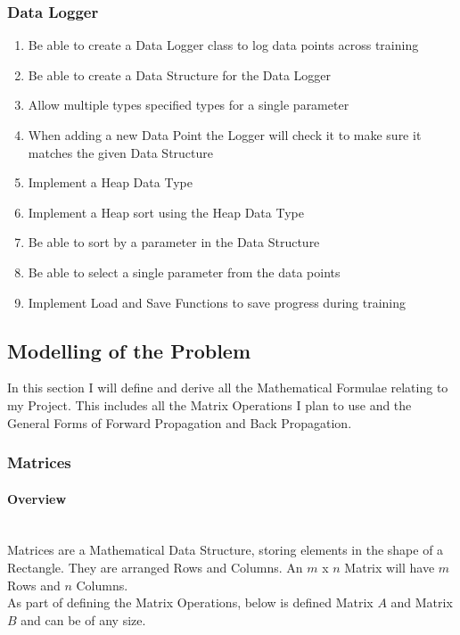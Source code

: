 \begin{flushleft}
            \subsubsection*{Data Logger}
                \begin{enumerate}
                    \item Be able to create a Data Logger class to log data points across training
                    \item Be able to create a Data Structure for the Data Logger
                    \item Allow multiple types specified types for a single parameter
                    \item When adding a new Data Point the Logger will check it to make sure it matches the given Data Structure
                    \item Implement a Heap Data Type
                    \item Implement a Heap sort using the Heap Data Type
                    \item Be able to sort by a parameter in the Data Structure
                    \item Be able to select a single parameter from the data points
                    \item Implement Load and Save Functions to save progress during training
                \end{enumerate}   
        \subsection{Modelling of the Problem}
            \large
            \vspace{0.2cm}
            In this section I will define and derive all the Mathematical Formulae relating to my Project. This includes all the Matrix Operations 
            I plan to use and the General Forms of Forward Propagation and Back Propagation. \\
            \vspace{0.2cm}

            \subsubsection{Matrices}
                \paragraph{Overview} \mbox{} \\
                Matrices are a Mathematical Data Structure, storing elements in the shape of a Rectangle. They are arranged Rows and Columns.
                An $m$ x $n$ Matrix will have $m$ Rows and $n$ Columns. \\
                \vspace{0.2cm}
                As part of defining the Matrix Operations, below is defined Matrix $A$ and Matrix $B$ and can be of any size. \\
                \vspace{0.5cm}


\end{flushleft}
